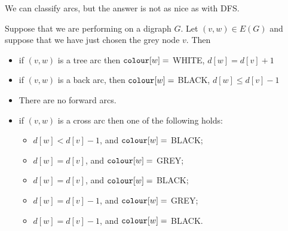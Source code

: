 
We can classify arcs, but the answer is not as nice as with DFS.

\begin{Theorem}
\label{thm:BFS-arcclass}
Suppose that we are performing  on a digraph $G$. Let $(v,
w)\in E(G)$ and suppose that we have just chosen the grey node $v$. 
Then
\begin{itemize}
\item
if $(v, w)$ is a tree arc then $\colour[w] = $ WHITE, $d[w] = d[v] + 1$
\item
if $(v, w)$ is a back arc, then $\colour[w] = $ BLACK, $d[w] \leq d[v] - 1$  
\item
There are no forward arcs.
\item
if $(v, w)$ is a cross arc then one of the following holds:
\begin{itemize}
\item $d[w] < d[v] - 1$, and $\colour[w] = $ BLACK;
\item $d[w] = d[v]$, and $\colour[w] = $ GREY;
\item $d[w] = d[v]$, and $\colour[w] = $ BLACK;
\item $d[w] = d[v] - 1$, and $\colour[w] = $ GREY;
\item $d[w] = d[v] - 1$, and $\colour[w] = $ BLACK.
\end{itemize}
\end{itemize}
\end{Theorem}

